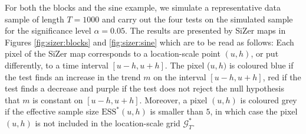 For both the blocks and the sine example, we simulate a representative data sample of length $T=1000$ and carry out the four tests on the simulated sample for the significance level $\alpha=0.05$. The results are presented by SiZer maps in Figures \ref{fig:sizer:blocks} and \ref{fig:sizer:sine} which are to be read as follows: Each pixel of the SiZer map corresponds to a location-scale point $(u,h)$, or put differently, to a time interval $[u-h,u+h]$. The pixel ($u,h)$ is coloured blue if the test finds an increase in the trend $m$ on the interval $[u-h,u+h]$, red if the test finds a decrease and purple if the test does not reject the null hypothesis that $m$ is constant on $[u-h,u+h]$. Moreover, a pixel $(u,h)$ is coloured grey if the effective sample size $\text{ESS}^*(u,h)$ is smaller than $5$, in which case the pixel $(u,h)$ is not included in the location-scale grid $\mathcal{G}_T^*$.


